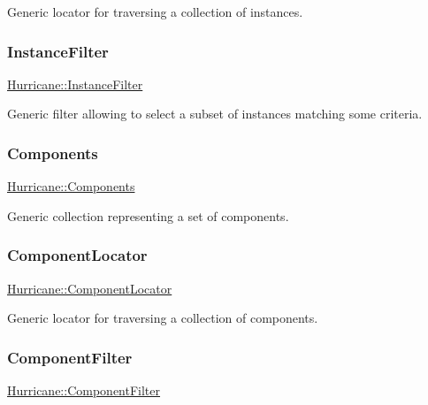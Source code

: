 Generic locator for traversing a collection of instances. \mbox{\label{namespaceHurricane_a889ec1441e1876d9addf89dfab32e772}} 
\subsubsection{\texorpdfstring{Instance\+Filter}{InstanceFilter}}
{\footnotesize\ttfamily \mbox{\hyperlink{namespaceHurricane_a889ec1441e1876d9addf89dfab32e772}{Hurricane\+::\+Instance\+Filter}}}

Generic filter allowing to select a subset of instances matching some criteria. \mbox{\label{namespaceHurricane_a7d26d99aeb5dd6d70d51bd35d2473e72}} 
\subsubsection{\texorpdfstring{Components}{Components}}
{\footnotesize\ttfamily \mbox{\hyperlink{namespaceHurricane_a7d26d99aeb5dd6d70d51bd35d2473e72}{Hurricane\+::\+Components}}}

Generic collection representing a set of components. \mbox{\label{namespaceHurricane_ad72b1998a4ff6e68326469dec9887f4d}} 
\subsubsection{\texorpdfstring{Component\+Locator}{ComponentLocator}}
{\footnotesize\ttfamily \mbox{\hyperlink{namespaceHurricane_ad72b1998a4ff6e68326469dec9887f4d}{Hurricane\+::\+Component\+Locator}}}

Generic locator for traversing a collection of components. \mbox{\label{namespaceHurricane_acbfacb3aada84aa054e587817f204e90}} 
\subsubsection{\texorpdfstring{Component\+Filter}{ComponentFilter}}
{\footnotesize\ttfamily \mbox{\hyperlink{namespaceHurricane_acbfacb3aada84aa054e587817f204e90}{Hurricane\+::\+Component\+Filter}}}


